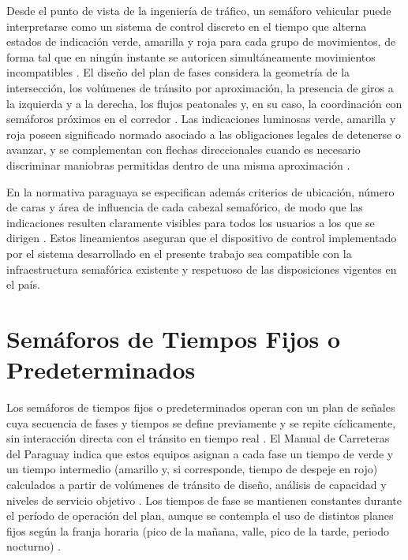 Desde el punto de vista de la ingeniería de tráfico, un semáforo vehicular puede interpretarse como un sistema de control discreto en el tiempo que alterna estados de indicación verde, amarilla y roja para cada grupo de movimientos, de forma tal que en ningún instante se autoricen simultáneamente movimientos incompatibles \cite{mopc2019manual,garber2019traffic}. El diseño del plan de fases considera la geometría de la intersección, los volúmenes de tránsito por aproximación, la presencia de giros a la izquierda y a la derecha, los flujos peatonales y, en su caso, la coordinación con semáforos próximos en el corredor \cite{mopc2019manual,roess2019traffic}. Las indicaciones luminosas verde, amarilla y roja poseen significado normado asociado a las obligaciones legales de detenerse o avanzar, y se complementan con flechas direccionales cuando es necesario discriminar maniobras permitidas dentro de una misma aproximación \cite{mopc2019manual}.

En la normativa paraguaya se especifican además criterios de ubicación, número de caras y área de influencia de cada cabezal semafórico, de modo que las indicaciones resulten claramente visibles para todos los usuarios a los que se dirigen \cite{mopc2019manual}. Estos lineamientos aseguran que el dispositivo de control implementado por el sistema desarrollado en el presente trabajo sea compatible con la infraestructura semafórica existente y respetuoso de las disposiciones vigentes en el país.



\section{Semáforos de Tiempos Fijos o Predeterminados}
\label{subsec:semaforos_tiempo_fijo}

Los semáforos de tiempos fijos o predeterminados operan con un plan de señales cuya secuencia de fases y tiempos se define previamente y se repite cíclicamente, sin interacción directa con el tránsito en tiempo real \cite{mopc2019manual}. El Manual de Carreteras del Paraguay indica que estos equipos asignan a cada fase un tiempo de verde y un tiempo intermedio (amarillo y, si corresponde, tiempo de despeje en rojo) calculados a partir de volúmenes de tránsito de diseño, análisis de capacidad y niveles de servicio objetivo \cite{mopc2019manual}. Los tiempos de fase se mantienen constantes durante el período de operación del plan, aunque se contempla el uso de distintos planes fijos según la franja horaria (pico de la mañana, valle, pico de la tarde, periodo nocturno) \cite{mopc2019manual,garber2019traffic}.

